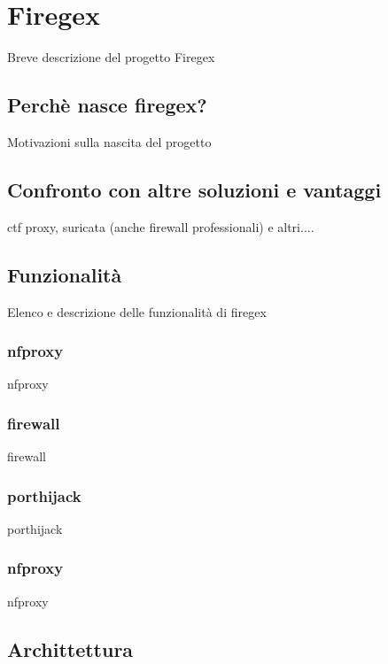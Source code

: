 \chapter{Firegex}

Breve descrizione del progetto Firegex

\section{Perchè nasce firegex?}

Motivazioni sulla nascita del progetto

\section{Confronto con altre soluzioni e vantaggi}

ctf proxy, suricata (anche firewall professionali) e altri....

\section{Funzionalità}

Elenco e descrizione delle funzionalità di firegex

\subsection{nfproxy}

nfproxy

\subsection{firewall}

firewall

\subsection{porthijack}

porthijack

\subsection{nfproxy}

nfproxy

\section{Archittettura}

